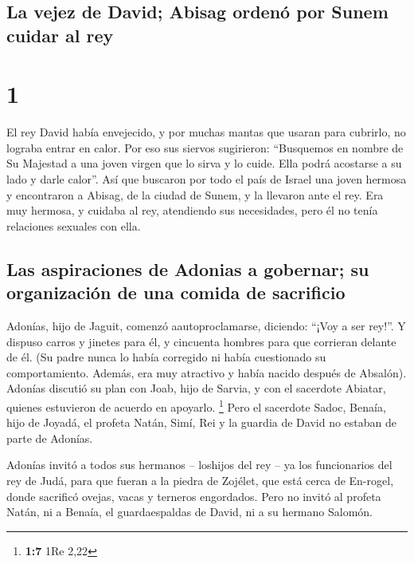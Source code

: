 \hypertarget{la-vejez-de-david-abisag-ordenuxf3-por-sunem-cuidar-al-rey}{%
\subsection{La vejez de David; Abisag ordenó por Sunem cuidar al
rey}\label{la-vejez-de-david-abisag-ordenuxf3-por-sunem-cuidar-al-rey}}

\hypertarget{section}{%
\section{1}\label{section}}

 El rey David había envejecido, y por muchas mantas que
usaran para cubrirlo, no lograba entrar en calor.  Por eso
sus siervos sugirieron: ``Busquemos en nombre de Su Majestad a una joven
virgen que lo sirva y lo cuide. Ella podrá acostarse a su lado y darle
calor''.  Así que buscaron por todo el país de Israel una
joven hermosa y encontraron a Abisag, de la ciudad de Sunem, y la
llevaron ante el rey.  Era muy hermosa, y cuidaba al rey,
atendiendo sus necesidades, pero él no tenía relaciones sexuales con
ella.

\hypertarget{las-aspiraciones-de-adonias-a-gobernar-su-organizaciuxf3n-de-una-comida-de-sacrificio}{%
\subsection{Las aspiraciones de Adonias a gobernar; su organización de
una comida de
sacrificio}\label{las-aspiraciones-de-adonias-a-gobernar-su-organizaciuxf3n-de-una-comida-de-sacrificio}}

 Adonías, hijo de Jaguit, comenzó aautoproclamarse,
diciendo: ``¡Voy a ser rey!''. Y dispuso carros y jinetes para él, y
cincuenta hombres para que corrieran delante de él.  (Su
padre nunca lo había corregido ni había cuestionado su comportamiento.
Además, era muy atractivo y había nacido después de Absalón).
 Adonías discutió su plan con Joab, hijo de Sarvia, y con
el sacerdote Abiatar, quienes estuvieron de acuerdo en apoyarlo.
\footnote{\textbf{1:7} 1Re 2,22}  Pero el sacerdote Sadoc,
Benaía, hijo de Joyadá, el profeta Natán, Simí, Rei y la guardia de
David no estaban de parte de Adonías.

 Adonías invitó a todos sus hermanos -- loshijos del rey
-- ya los funcionarios del rey de Judá, para que fueran a la piedra de
Zojélet, que está cerca de En-rogel, donde sacrificó ovejas, vacas y
terneros engordados.  Pero no invitó al profeta Natán, ni
a Benaía, el guardaespaldas de David, ni a su hermano Salomón.

